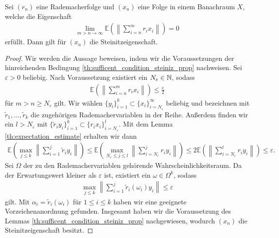\begin{sz}
	Sei $ (r_n) $ eine Rademacherfolge und  $ (x_n) $ eine Folge in einem Banachraum $ X $, welche die Eigenschaft
	\begin{align*}
		\lim \limits_{m > n \to \infty} \mathbb{E}
		\left(
		\left\|
		\sum \limits_{i=n}^m
		r_i x_i
		\right\|
		\right) = 0
	\end{align*}
	erfüllt. Dann gilt für $ (x_n) $ die Steinitzeigenschaft.
\end{sz}
\begin{proof}
Wir werden die Aussage beweisen, indem wir die Voraussetzungen der hinreichenden Bedingung \ref{th:sufficent_condition_steiniz_prop} nachweisen.	
Sei $ \varepsilon > 0  $ beliebig. Nach Voraussetzung existiert ein $ N_\varepsilon \in \mathbb{N}$, sodass
\begin{align*}
	\mathbb{E}
	\left(
	\left\|
	\sum 
	\limits_{i=n}^m r_i x_i
	\right\|
	\right)
	\leq 
	\frac{\varepsilon}{2}
\end{align*}
für $ m > n \geq N_\varepsilon $ gilt.
Wir wählen $ \{y_i\}_{i=1}^k \subset \{x_i\}_{i=N_\varepsilon}^\infty$ beliebig und bezeichnen
mit $ \tilde{r}_1,...,\tilde{r}_k $ die zugehörigen Rademachervariablen in der Reihe.
Außerdem finden wir ein $ l > N_\varepsilon $ mit $ \{\tilde{r}_i y_i\}_{i=1}^k \subset \{r_i x_i\}_{i=N_\varepsilon}^l$.
Mit dem Lemma \ref{th:expectation_estimate} erhalten wir dann
\begin{align*}
	\mathbb{E}
	\left(
	\max \limits_{j \leq k}
	\left\|
	\sum \limits_{i = 1}^j
	\tilde{r}_i y_i
	\right\|
	\right)
	\leq 
	\mathbb{E}
	\left(
	\max \limits_{N_\varepsilon \leq j \leq  l}
	\left\|
	\sum \limits_{i = N_\varepsilon}^j
	r_i y_i
	\right\|
	\right)
	\leq 
	2 
	\mathbb{E}
	\left(
	\left\|
	\sum \limits_{i = N_\varepsilon}^l
	r_i y_i
	\right\|
	\right)
	\leq 
	\varepsilon.
\end{align*}
Sei $ \Omega $ der zu den Rademachervariablen gehörende Wahrscheinlichkeitsraum.
Da der Erwartungswert kleiner als $ \varepsilon $ ist, existiert ein $ \omega \in \Omega^k $, sodass
\begin{align*}
	\max \limits_{j \leq k}
	\left\|
	\sum \limits_{i = 1}^j
	\tilde{r}_i(\omega_i) y_i
	\right\|
	\leq \varepsilon
\end{align*}
gilt. Mit $ \alpha_i = \tilde{r}_i(\omega_i) $ für $  1 \leq i \leq k$ haben wir eine geeignete Vorzeichenanordnung gefunden.
Insgesamt haben wir die Voraussetzung des Lemmas \ref{th:sufficent_condition_steiniz_prop} nachgewiesen, wodurch $ (x_n) $ die Steinitzeigenschaft besitzt.
\end{proof}

